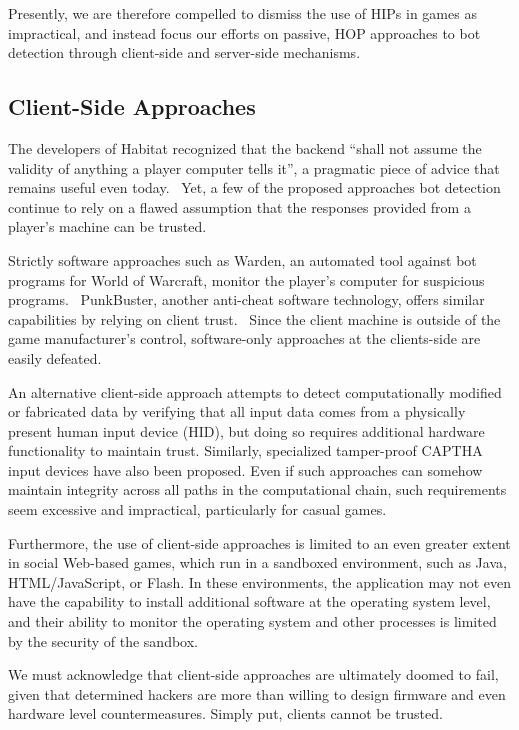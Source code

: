 \documentclass{acm_proc_article-sp}
\begin{document}
Presently, we are therefore compelled to dismiss the use of HIPs in games as impractical, and instead focus our efforts on passive, HOP approaches to bot detection through client-side and server-side mechanisms.

\subsection{Client-Side Approaches}

The developers of Habitat recognized that the backend ``shall not assume the validity of anything a player computer tells it'', a pragmatic piece of advice that remains useful even today.~\cite{habitat} Yet, a few of the proposed approaches bot detection continue to rely on a flawed assumption that the responses provided from a player's machine can be trusted.

Strictly software approaches such as Warden, an automated tool against bot programs for World of Warcraft, monitor the player's computer for suspicious programs.~\cite{serverside} PunkBuster, another anti-cheat software technology, offers similar capabilities by relying on client trust.~\cite{punk} Since the client machine is outside of the game manufacturer's control,  software-only approaches at the clients-side are easily defeated.~\cite{exploit}

An alternative client-side approach attempts to detect computationally modified or fabricated data by verifying that all input data comes from a physically present human input device (HID), but doing so requires additional hardware functionality to maintain trust. Similarly, specialized tamper-proof CAPTHA input devices have also been proposed. Even if such approaches can somehow maintain integrity across all paths in the computational chain, such requirements seem excessive and impractical, particularly for casual games.

Furthermore, the use of client-side approaches is limited to an even greater extent in social Web-based games, which run in a sandboxed environment, such as Java, HTML/JavaScript, or Flash. In these environments, the application may not even have the capability to install additional software at the operating system level, and their ability to monitor the operating system and other processes is limited by the security of the sandbox.

We must acknowledge that client-side approaches are ultimately doomed to fail, given that determined hackers are more than willing to design firmware and even hardware level countermeasures. Simply put, clients cannot be trusted.
\end{document}
